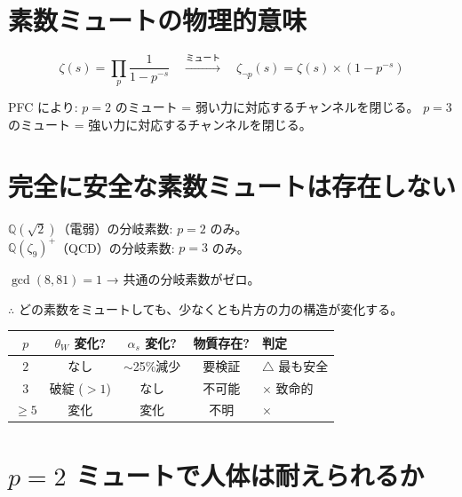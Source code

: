 \documentclass[12pt,a4paper]{article}
\begin{document}
\section{素数ミュートの物理的意味}

\begin{mathbox}[素数ミュート = オイラー因子の除去]
$$\zeta(s) = \prod_p \frac{1}{1-p^{-s}} \quad \xrightarrow{\text{ミュート}} \quad \zeta_{\neg p}(s) = \zeta(s) \times (1-p^{-s})$$

PFC により:
$p=2$ のミュート = 弱い力に対応するチャンネルを閉じる。
$p=3$ のミュート = 強い力に対応するチャンネルを閉じる。
\end{mathbox}

\section{完全に安全な素数ミュートは存在しない}

\begin{dangerbox}[核心的問題]
$\mathbb{Q}(\sqrt{2})$（電弱）の分岐素数: $p=2$ のみ。\\
$\mathbb{Q}(\zeta_9)^+$（QCD）の分岐素数: $p=3$ のみ。

$\gcd(8, 81) = 1$ → 共通の分岐素数がゼロ。

$\therefore$ どの素数をミュートしても、少なくとも片方の力の構造が変化する。
\end{dangerbox}

\begin{center}
\renewcommand{\arraystretch}{1.3}
\begin{tabular}{ccccl}
\toprule
$p$ & $\theta_W$ 変化? & $\alpha_s$ 変化? & 物質存在? & 判定 \\
\midrule
$2$ & なし & $\sim$25\%減少 & 要検証 & $\triangle$ 最も安全 \\
$3$ & 破綻 ($>1$) & なし & 不可能 & $\times$ 致命的 \\
$\geq 5$ & 変化 & 変化 & 不明 & $\times$ \\
\bottomrule
\end{tabular}
\end{center}

\section{$p=2$ ミュートで人体は耐えられるか}
\end{document}
